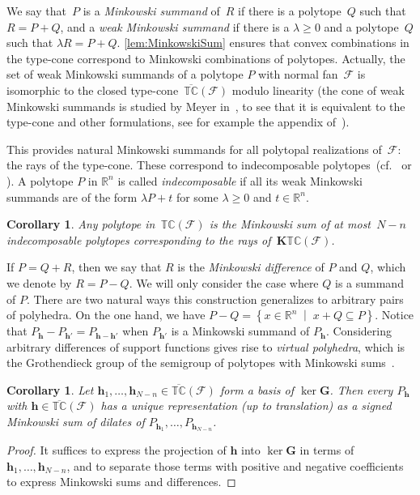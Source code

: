 \documentclass{amsart}
\newtheorem{corollary}[theorem]{Corollary}
\theoremstyle{definition}
\newcommand{\R}{\mathbb{R}} %
\renewcommand{\b}[1]{{\boldsymbol{#1}}} %
\newcommand{\set}[2]{\left\{ #1 \;\middle|\; #2 \right\}} %
\newcommand{\darkblue}{\color{darkblue}} %
\newcommand{\defn}[1]{\textsl{\darkblue #1}} %
\newcommand{\arnau}[1]{\todo[color=orange!30]{#1 --- A.}}
\newcommand{\Fan}{\mathcal{F}} %
\newcommand{\typeCone}{\mathbb{TC}} %
\newcommand{\ctypeCone}{\overline{\mathbb{TC}}} %
\begin{document}
We say that~$P$ is a \defn{Minkowski summand} of~$R$ if there is a polytope~$Q$ such that $R=P+Q$, and a \defn{weak Minkowski summand} if there is a $\lambda\geq 0$ and a polytope~$Q$ such that $\lambda R=P+Q$. 
\cref{lem:MinkowskiSum} ensures that convex combinations in the type-cone correspond to Minkowski combinations of polytopes. Actually, the set of weak Minkowski summands of a polytope $P$ with normal fan~$\Fan$ is isomorphic to the closed type-cone~$\ctypeCone(\Fan)$ modulo linearity (the cone of weak Minkowski summands is studied by Meyer in~\cite{Meyer1974}, to see that it is equivalent to the type-cone and other formulations, see for example the appendix of~\cite{PostnikovReinerWilliams}).

This provides natural Minkowski summands for all polytopal realizations of~$\Fan$: the rays of the type-cone. These correspond to indecomposable polytopes~(cf.~\cite{Meyer1974} or \cite{McMullen-typeCone}). A polytope $P$ in $\R^n$ is 
  called \defn{indecomposable} if all its weak Minkowski summands are of the form $\lambda P+t$ for some $\lambda\geq 0$ and $t\in\R^n$.

\begin{corollary}
\arnau{See \cite{Meyer1974} and \cite{McMullen-typeCone}}
Any polytope in~$\typeCone(\Fan)$ is the Minkowski sum of at most~$N-n$ indecomposable polytopes corresponding to the rays of~$\b{K}\typeCone(\Fan)$.
\end{corollary}


If $P=Q+R$, then we say that $R$ is the \defn{Minkowski difference} of $P$ and $Q$, which we denote by $R=P-Q$. We will only consider the case where $Q$ is a summand of $P$.
There are two natural ways this construction generalizes to arbitrary pairs of polyhedra. On the one hand, we have $P-Q=\set{x\in\R^n}{x+Q\subseteq P}$. 
Notice that $P_\b{h}-P_{\b{h}'}=P_{\b{h} - \b{h'}}$ when $P_{\b{h}'}$ is a Minkowski summand of $P_\b{h}$. Considering arbitrary differences of support functions gives rise to  \defn{virtual polyhedra}, which is the Grothendieck group of the semigroup of polytopes with Minkowski sums~\cite{PukhlikovKhovanskii1992}.

\begin{corollary}
Let $\b{h}_1,\dots, \b{h}_{N-n}\in \ctypeCone(\Fan)$ form a basis of $\ker \b{G}$. Then every $P_\b{h}$ with $\b{h}\in \ctypeCone(\Fan)$ has a unique representation (up to translation) as a signed Minkowski sum of dilates of $P_{\b{h}_1},\dots, P_{\b{h}_{N-n}}$.
\end{corollary}
\begin{proof}
 It suffices to express the projection of $\b{h}$ into $\ker\b{G}$ in terms of $\b{h}_1,\dots, \b{h}_{N-n}$, and to separate those terms with positive and negative coefficients to express Minkowski sums and differences.
\end{proof}
\end{document}
